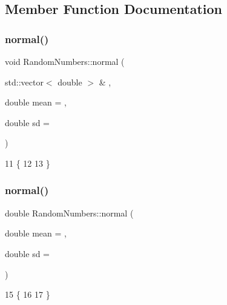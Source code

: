 \subsection{Member Function Documentation}
\mbox{\label{classRandomNumbers_a4ef5917200da65aa267735d389bdf995}} 
\subsubsection{\texorpdfstring{normal()}{normal()}\hspace{0.1cm}{\footnotesize\ttfamily [1/2]}}
{\footnotesize\ttfamily void Random\+Numbers\+::normal (\begin{DoxyParamCaption}\item[{std\+::vector$<$ double $>$ \&}]{,  }\item[{double}]{mean = {},  }\item[{double}]{sd = {} }\end{DoxyParamCaption})}


\begin{DoxyCode}
11                                                                          \{
12     
13 \}
\end{DoxyCode}
\mbox{\label{classRandomNumbers_abbfcbae72e7dbd048567dd5b8e2ce9d2}} 
\subsubsection{\texorpdfstring{normal()}{normal()}\hspace{0.1cm}{\footnotesize\ttfamily [2/2]}}
{\footnotesize\ttfamily double Random\+Numbers\+::normal (\begin{DoxyParamCaption}\item[{double}]{mean = {},  }\item[{double}]{sd = {} }\end{DoxyParamCaption})}


\begin{DoxyCode}
15                                                        \{
16     
17 \}
\end{DoxyCode}
\mbox{\label{classRandomNumbers_a69e33058b8a923f9597cf13421d5fcd4}} 
